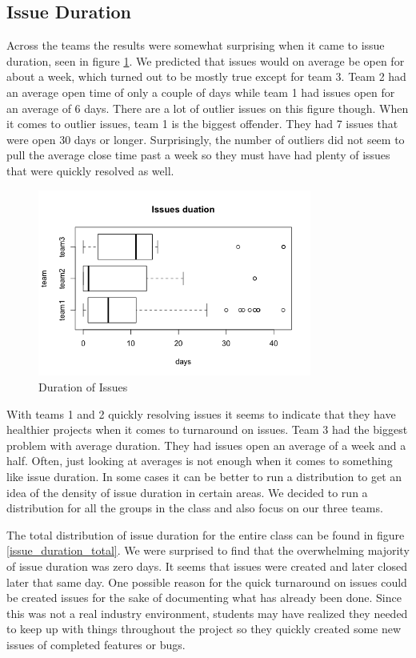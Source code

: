 \documentclass[conference]{IEEEtran}
\begin{document}
\subsection{Issue Duration}
Across the teams the results were somewhat surprising when it came to issue duration, seen in figure \ref{issue_duration}. We predicted that issues would on average be open for about a week, which turned out to be mostly true except for team 3. Team 2 had an average open time of only a couple of days while team 1 had issues open for an average of 6 days. There are a lot of outlier issues on this figure though. When it comes to outlier issues, team 1 is the biggest offender. They had 7 issues that were open 30 days or longer. Surprisingly, the number of outliers did not seem to pull the average close time past a week so they must have had plenty of issues that were quickly resolved as well. 

\begin{figure}[H]
    \centering
    \includegraphics[width=9cm]{../AprilProject/pic/issues_duration.png}
    \caption{Duration of Issues}
    \label{issue_duration}
\end{figure}

With teams 1 and 2 quickly resolving issues it seems to indicate that they have healthier projects when it comes to turnaround on issues. Team 3 had the biggest problem with average duration. They had issues open an average of a week and a half. Often, just looking at averages is not enough when it comes to something like issue duration. In some cases it can be better to run a distribution to get an idea of the density of issue duration in certain areas. We decided to run a distribution for all the groups in the class and also focus on our three teams. 

The total distribution of issue duration for the entire class can be found in figure \ref{issue_duration_total}. We were surprised to find that the overwhelming majority of issue duration was zero days. It seems that issues were created and later closed later that same day. One possible reason for the quick turnaround on issues could be created issues for the sake of documenting what has already been done. Since this was not a real industry environment, students may have realized they needed to keep up with things throughout the project so they quickly created some new issues of completed features or bugs. 
\end{document}
